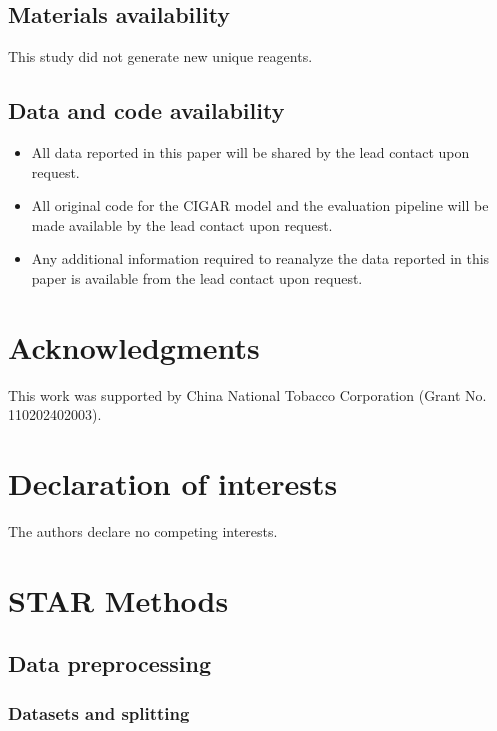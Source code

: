 \documentclass[11pt]{article}
\begin{document}
\subsection*{Materials availability}

This study did not generate new unique reagents.

\subsection*{Data and code availability}

\begin{itemize}
    \item All data reported in this paper will be shared by the lead contact upon request.
    \item All original code for the CIGAR model and the evaluation pipeline will be made available by the lead contact upon request.
    \item Any additional information required to reanalyze the data reported in this paper is available from the lead contact upon request.
\end{itemize}

\section*{Acknowledgments}

This work was supported by China National Tobacco Corporation (Grant No. 110202402003).

\section*{Declaration of interests}

The authors declare no competing interests.


\section*{STAR Methods}

\subsection*{Data preprocessing}

\subsubsection*{Datasets and splitting}
\end{document}
